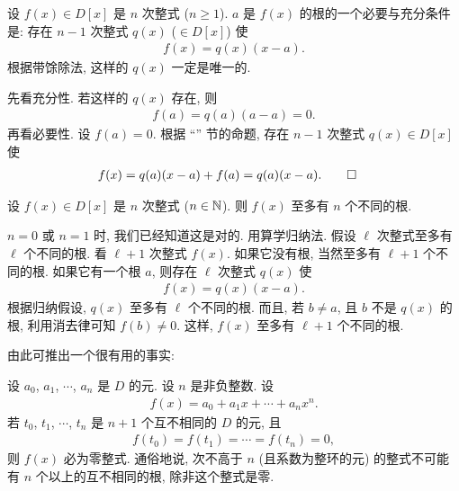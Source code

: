 \begin{proposition}
    设 $f(x) \in D[x]$ 是 $n$ 次整式 ($n \geq 1$). $a$ 是 $f(x)$ 的根的一个必要与充分条件是: 存在 $n-1$ 次整式 $q(x)$ ($\in D[x]$) 使
    \begin{align*}
        f(x) = q(x) (x-a).
    \end{align*}
    根据带馀除法, 这样的 $q(x)$ 一定是唯一的.
\end{proposition}

\begin{pf}
    先看充分性. 若这样的 $q(x)$ 存在, 则
    \begin{align*}
        f(a) = q(a) (a-a) = 0.
    \end{align*}
    再看必要性. 设 $f(a)=0$. 根据 ``\ValueOfAPolynomialAtAPoint'' 节的命题, 存在 $n-1$ 次整式 $q(x) \in D[x]$ 使
    \begin{align*}
         & f(x) = q(a) (x-a) + f(a) = q(a) (x-a). \qedhere
    \end{align*}
\end{pf}

\begin{proposition}
    设 $f(x) \in D[x]$ 是 $n$ 次整式 ($n \in \mathbb{N}$). 则 $f(x)$ 至多有 $n$ 个不同的根.
\end{proposition}

\begin{pf}
    $n = 0$ 或 $n = 1$ 时, 我们已经知道这是对的. 用算学归纳法. 假设 $\ell$ 次整式至多有 $\ell$ 个不同的根. 看 $\ell + 1$ 次整式 $f(x)$. 如果它没有根, 当然至多有 $\ell + 1$ 个不同的根. 如果它有一个根 $a$, 则存在 $\ell$ 次整式 $q(x)$ 使
    \begin{align*}
        f(x) = q(x) (x-a).
    \end{align*}
    根据归纳假设, $q(x)$ 至多有 $\ell$ 个不同的根. 而且, 若 $b \neq a$, 且 $b$ 不是 $q(x)$ 的根, 利用消去律可知 $f(b) \neq 0$. 这样, $f(x)$ 至多有 $\ell + 1$ 个不同的根.
\end{pf}

由此可推出一个很有用的事实:

\begin{proposition}
    设 $a_0$, $a_1$, $\cdots$, $a_n$ 是 $D$ 的元. 设 $n$ 是非负整数. 设
    \begin{align*}
        f(x) = a_0 + a_1 x + \cdots + a_n x^n.
    \end{align*}
    若 $t_0$, $t_1$, $\cdots$, $t_n$ 是 $n+1$ 个互不相同的 $D$ 的元, 且
    \begin{align*}
        f(t_0) = f(t_1) = \cdots = f(t_n) = 0,
    \end{align*}
    则 $f(x)$ 必为零整式. 通俗地说, 次不高于 $n$ (且系数为整环的元) 的整式不可能有 $n$ 个以上的互不相同的根, 除非这个整式是零.
\end{proposition}

